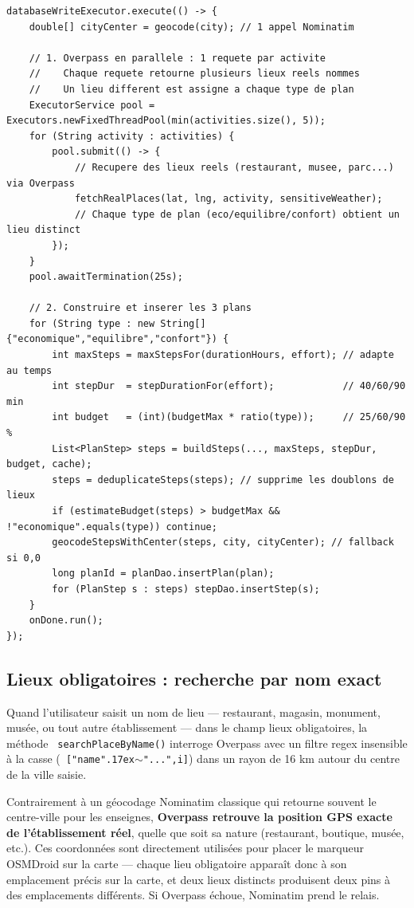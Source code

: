 \documentclass[a4paper,12pt,openany]{report}
\newcommand{\ic}[1]{\texttt{\small\colorbox{lightbg}{\color{navy!90} #1}}}
\begin{document}
\begin{lstlisting}
databaseWriteExecutor.execute(() -> {
    double[] cityCenter = geocode(city); // 1 appel Nominatim

    // 1. Overpass en parallele : 1 requete par activite
    //    Chaque requete retourne plusieurs lieux reels nommes
    //    Un lieu different est assigne a chaque type de plan
    ExecutorService pool = Executors.newFixedThreadPool(min(activities.size(), 5));
    for (String activity : activities) {
        pool.submit(() -> {
            // Recupere des lieux reels (restaurant, musee, parc...) via Overpass
            fetchRealPlaces(lat, lng, activity, sensitiveWeather);
            // Chaque type de plan (eco/equilibre/confort) obtient un lieu distinct
        });
    }
    pool.awaitTermination(25s);

    // 2. Construire et inserer les 3 plans
    for (String type : new String[]{"economique","equilibre","confort"}) {
        int maxSteps = maxStepsFor(durationHours, effort); // adapte au temps
        int stepDur  = stepDurationFor(effort);            // 40/60/90 min
        int budget   = (int)(budgetMax * ratio(type));     // 25/60/90 %
        List<PlanStep> steps = buildSteps(..., maxSteps, stepDur, budget, cache);
        steps = deduplicateSteps(steps); // supprime les doublons de lieux
        if (estimateBudget(steps) > budgetMax && !"economique".equals(type)) continue;
        geocodeStepsWithCenter(steps, city, cityCenter); // fallback si 0,0
        long planId = planDao.insertPlan(plan);
        for (PlanStep s : steps) stepDao.insertStep(s);
    }
    onDone.run();
});
\end{lstlisting}

\subsection{Lieux obligatoires : recherche par nom exact}

Quand l'utilisateur saisit un nom de lieu — restaurant, magasin, monument,
musée, ou tout autre établissement — dans le champ lieux obligatoires,
la méthode \ic{searchPlaceByName()} interroge Overpass avec un filtre regex
insensible à la casse (\ic{["name"{\raise.17ex\hbox{$\scriptstyle\sim$}}"...",i]}) dans un rayon de 16 km
autour du centre de la ville saisie.

Contrairement à un géocodage Nominatim classique qui retourne souvent
le centre-ville pour les enseignes, \textbf{Overpass retrouve la position GPS
exacte de l'établissement réel}, quelle que soit sa nature (restaurant,
boutique, musée, etc.). Ces coordonnées sont directement utilisées pour
placer le marqueur OSMDroid sur la carte — chaque lieu obligatoire
apparaît donc à son emplacement précis sur la carte, et deux lieux distincts
produisent deux pins à des emplacements différents.
Si Overpass échoue, Nominatim prend le relais.
\end{document}
